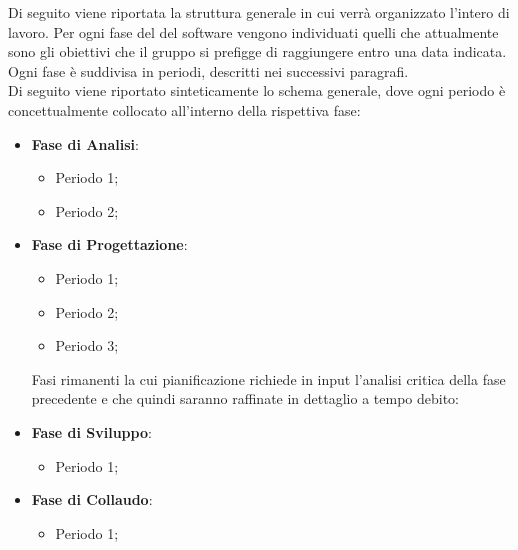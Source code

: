 Di seguito viene riportata la struttura generale in cui verrà organizzato l'intero  di lavoro.  Per ogni fase del  del software vengono individuati quelli che attualmente sono gli obiettivi che il gruppo \Gruppo{} si prefigge di raggiungere entro una data indicata. Ogni fase è suddivisa in periodi, descritti nei successivi paragrafi.\\
Di seguito viene riportato sinteticamente lo schema generale, dove ogni periodo è concettualmente collocato all'interno della rispettiva fase:

\begin{itemize}
    \item \textbf{Fase di Analisi}:
    \begin{itemize}
        \item Periodo 1;
        \item Periodo 2;
    \end{itemize}

    \item \textbf{Fase di Progettazione}:
    \begin{itemize}
        \item Periodo 1;
        \item Periodo 2;
        \item Periodo 3;
    \end{itemize}
    Fasi rimanenti la cui pianificazione richiede in input l'analisi critica della fase precedente e che quindi saranno raffinate in dettaglio a tempo debito:
                    
    \item \textbf{Fase di Sviluppo}:
    \begin{itemize}  
        \item Periodo 1;
    \end{itemize}

    \item \textbf{Fase di Collaudo}:
        \begin{itemize}        
            \item Periodo 1;
        \end{itemize}
        
\end{itemize}

